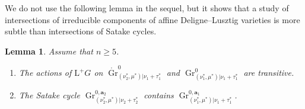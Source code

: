 \documentclass[12pt,a4paper]{article}
\newtheorem{lem}[thm]{Lemma}
\DeclareMathOperator{\Gr}{Gr}
\newcommand{\bfa}{\mathbf{a}}
\newcommand{\rL}{\mathrm{L}}
\begin{document}
We do not use the following lemma in the sequel, 
but it shows that a study of 
intersections of irreducible components of affine Deligne--Lusztig varieties is 
more subtle than intersections of Satake cycles. 

\begin{lem}\label{lem:Scon}
Assume that $n \geq 5$. 
\begin{enumerate}
\item\label{en:tran12}
The actions of $\rL^+G$ on 
$\mathring{\Gr}^{0}_{(\nu^*_2, \mu^*) | \nu_1 +\tau_1^*}$ and 
$\Gr^{0}_{(\nu^*_1, \mu^*) | \nu_1 +\tau_1^*}$ are 
transitive. 
\item\label{en:cont12} 
The Satake cycle 
$\Gr^{0,\bfa_2}_{(\nu^*_2, \mu^*) | \nu_2 +\tau_2^*}$ contains 
$\Gr^{0,\bfa_1}_{(\nu^*_1, \mu^*) | \nu_1 +\tau_1^*}$. 
\end{enumerate}
\end{lem}
\end{document}
